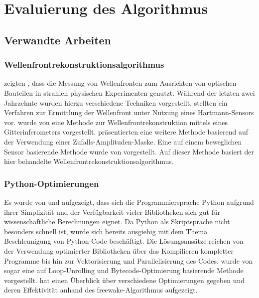 \chapter{Evaluierung des Algorithmus}

\section{Verwandte Arbeiten}

\subsection{Wellenfrontrekonstruktionsalgorithmus}

\citeauthor{GNS+11} zeigten \citeyear{GNS+11}, dass die Messung von Wellenfronten zum Ausrichten von optischen Bauteilen in strahlen physischen Experimenten genutzt.\cite{GNS+11} Während der letzten zwei Jahrzehnte wurden hierzu verschiedene Techniken vorgestellt. \citeauthor{MZI+03} stellten \citeyear{MZI+03} ein Verfahren zur Ermittlung der Wellenfront unter Nutzung eines Hartmann-Sensors vor.\cite{MZI+03} \citeyear{WND+05} wurde von \citeauthor{WND+05} eine Methode zur Wellenfrontrekonstruktion mittels eines Gitterinferometers vorgestellt.\cite{WND+05} \citeauthor{APO+07} präsentierten \citeyear{APO+07} eine weitere Methode basierend auf der Verwendung einer Zufalls-Amplituden-Maske. \cite{APO+07} Eine auf einem beweglichen Sensor basierende Methode wurde \citeyear{Ber12} von \citeauthor{Ber12} vorgestellt. \cite{Ber12} Auf dieser Methode basiert der hier behandelte Wellenfrontrekonstruktionsalgorithmus. 

\subsection{Python-Optimierungen}

Es wurde von \citeauthor{Oli07} und \citeauthor{PGH11} aufgezeigt, dass sich die Programmiersprache Python aufgrund ihrer Simplizität und der Verfügbarkeit vieler Bibliotheken sich gut für wissenschaftliche Berechnungen eignet. \cite{Oli07,PGH11} Da Python als Skriptsprache nicht besonders schnell ist, wurde sich bereits ausgiebig mit dem Thema Beschleunigung von Python-Code beschäftigt. Die Lösungsansätze reichen von der Verwendung optimierter Bibliotheken über das Kompilieren kompletter Programme bis hin zur Vektorisierung und Parallelisierung des Codes. \citeyear{BR09} wurde von \citeauthor{BR09} sogar eine auf Loop-Unrolling und Bytecode-Optimierung basierende Methode vorgestellt. \cite{BR09}
\citeauthor{Ill14} hat \citeyear{Ill14} einen Überblick über verschiedene Optimierungen gegeben und deren Effektivität anhand des freewake-Algorithmus aufgezeigt. \cite{Ill14}

